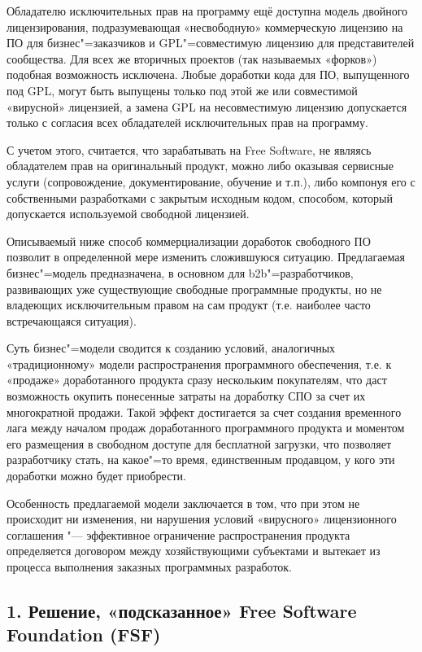 \documentclass[10pt, a5paper]{article}
\begin{document}
Обладателю исключительных прав на программу ещё доступна модель двойного лицензирования, подразумевающая «несвободную» коммерческую лицензию на ПО для бизнес"=заказчиков и GPL"=совместимую лицензию  для представителей сообщества. Для всех же вторичных проектов (так называемых «форков») подобная возможность исключена. Любые доработки кода для ПО, выпущенного под GPL, могут быть выпущены только под этой же или совместимой «вирусной» лицензией, а замена GPL на несовместимую лицензию допускается только с согласия всех обладателей исключительных прав на программу.

С учетом этого, считается, что зарабатывать на Free Software, не являясь обладателем прав на оригинальный продукт, можно либо оказывая сервисные услуги (сопровождение, документирование, обучение и т.п.), либо компонуя его с собственными разработками с закрытым исходным кодом, способом, который допускается используемой свободной лицензией.

Описываемый ниже способ коммерциализации доработок свободного ПО позволит в определенной мере изменить сложившуюся ситуацию. Предлагаемая бизнес"=модель предназначена, в основном для b2b"=разработчиков, развивающих уже существующие свободные программные продукты, но не владеющих исключительным правом на сам продукт (т.е. наиболее часто встречающаяся ситуация).

Суть бизнес"=модели сводится к созданию условий, аналогичных «традиционному» модели распространения программного обеспечения, т.е. к «продаже» доработанного продукта сразу нескольким покупателям, что даст возможность окупить понесенные затраты на доработку СПО за счет их многократной продажи. Такой эффект достигается за счет создания временного лага между началом продаж доработанного программного продукта и моментом его размещения в свободном доступе для бесплатной загрузки, что позволяет разработчику стать, на какое"=то время, единственным продавцом, у кого эти доработки можно будет приобрести.

Особенность предлагаемой модели заключается в том, что при этом не происходит ни изменения, ни нарушения условий «вирусного» лицензионного соглашения "--- эффективное ограничение распространения продукта определяется договором между хозяйствующими субъектами и вытекает из процесса выполнения заказных программных разработок.

\subsection*{1. Решение, «подсказанное» Free Software \linebreak Foundation (FSF)}
\end{document}
